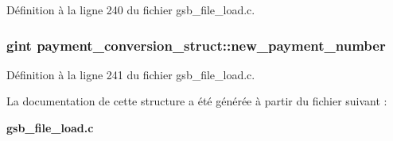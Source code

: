 Définition à la ligne 240 du fichier gsb\_\-file\_\-load.c.

\subsubsection[{new\_\-payment\_\-number}]{\setlength{\rightskip}{0pt plus 5cm}gint {\bf payment\_\-conversion\_\-struct::new\_\-payment\_\-number}}\label{structpayment__conversion__struct_af2ff9bc955eb68a9e01586c310ad91c8}


Définition à la ligne 241 du fichier gsb\_\-file\_\-load.c.



La documentation de cette structure a été générée à partir du fichier suivant :\begin{DoxyCompactItemize}
\item 
{\bf gsb\_\-file\_\-load.c}\end{DoxyCompactItemize}
